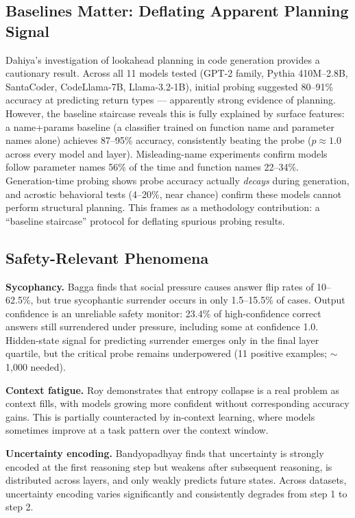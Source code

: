 \documentclass[midterm]{sparreport}
\begin{document}
\subsection{Baselines Matter: Deflating Apparent Planning Signal}

Dahiya's investigation of lookahead planning in code generation provides a cautionary result. Across all 11 models tested (GPT-2 family, Pythia 410M--2.8B, SantaCoder, CodeLlama-7B, Llama-3.2-1B), initial probing suggested 80--91\% accuracy at predicting return types --- apparently strong evidence of planning. However, the baseline staircase reveals this is fully explained by surface features: a name+params baseline (a classifier trained on function name and parameter names alone) achieves 87--95\% accuracy, consistently beating the probe ($p \approx 1.0$ across every model and layer). Misleading-name experiments confirm models follow parameter names 56\% of the time and function names 22--34\%. Generation-time probing shows probe accuracy actually \emph{decays} during generation, and acrostic behavioral tests (4--20\%, near chance) confirm these models cannot perform structural planning. This frames as a methodology contribution: a ``baseline staircase'' protocol for deflating spurious probing results.

\subsection{Safety-Relevant Phenomena}

\textbf{Sycophancy.} Bagga finds that social pressure causes answer flip rates of 10--62.5\%, but true sycophantic surrender occurs in only 1.5--15.5\% of cases. Output confidence is an unreliable safety monitor: 23.4\% of high-confidence correct answers still surrendered under pressure, including some at confidence 1.0. Hidden-state signal for predicting surrender emerges only in the final layer quartile, but the critical probe remains underpowered (11 positive examples; $\sim$1,000 needed).

\textbf{Context fatigue.} Roy demonstrates that entropy collapse is a real problem as context fills, with models growing more confident without corresponding accuracy gains. This is partially counteracted by in-context learning, where models sometimes improve at a task pattern over the context window.

\textbf{Uncertainty encoding.} Bandyopadhyay finds that uncertainty is strongly encoded at the first reasoning step but weakens after subsequent reasoning, is distributed across layers, and only weakly predicts future states. Across datasets, uncertainty encoding varies significantly and consistently degrades from step 1 to step 2.
\end{document}
